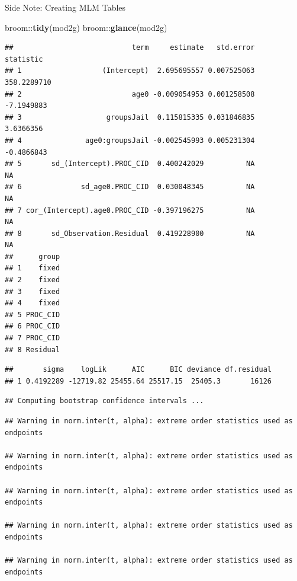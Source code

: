 \documentclass[ignorenonframetext,]{beamer}
\newenvironment{Shaded}{\begin{snugshade}}{\end{snugshade}}
\newcommand{\KeywordTok}[1]{\textcolor[rgb]{0.13,0.29,0.53}{\textbf{{#1}}}}
\newcommand{\NormalTok}[1]{{#1}}
\begin{document}
\begin{frame}[fragile]{Side Note: Creating MLM Tables}

\begin{Shaded}
\begin{Highlighting}[]
\NormalTok{broom::}\KeywordTok{tidy}\NormalTok{(mod2g)}
\NormalTok{broom::}\KeywordTok{glance}\NormalTok{(mod2g)}
\end{Highlighting}
\end{Shaded}

\tiny

\begin{verbatim}
##                            term     estimate   std.error   statistic
## 1                   (Intercept)  2.695695557 0.007525063 358.2289710
## 2                          age0 -0.009054953 0.001258508  -7.1949883
## 3                    groupsJail  0.115815335 0.031846835   3.6366356
## 4               age0:groupsJail -0.002545993 0.005231304  -0.4866843
## 5       sd_(Intercept).PROC_CID  0.400242029          NA          NA
## 6              sd_age0.PROC_CID  0.030048345          NA          NA
## 7 cor_(Intercept).age0.PROC_CID -0.397196275          NA          NA
## 8       sd_Observation.Residual  0.419228900          NA          NA
##      group
## 1    fixed
## 2    fixed
## 3    fixed
## 4    fixed
## 5 PROC_CID
## 6 PROC_CID
## 7 PROC_CID
## 8 Residual
\end{verbatim}

\begin{verbatim}
##       sigma    logLik      AIC      BIC deviance df.residual
## 1 0.4192289 -12719.82 25455.64 25517.15  25405.3       16126
\end{verbatim}

\begin{verbatim}
## Computing bootstrap confidence intervals ...
\end{verbatim}

\begin{verbatim}
## Warning in norm.inter(t, alpha): extreme order statistics used as endpoints

## Warning in norm.inter(t, alpha): extreme order statistics used as endpoints

## Warning in norm.inter(t, alpha): extreme order statistics used as endpoints

## Warning in norm.inter(t, alpha): extreme order statistics used as endpoints

## Warning in norm.inter(t, alpha): extreme order statistics used as endpoints


\end{verbatim}
\end{frame}
\end{document}
